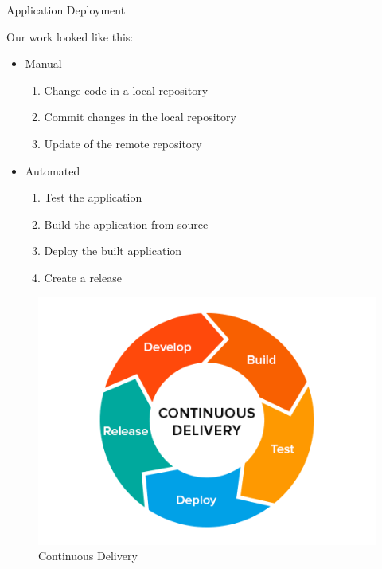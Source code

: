 \documentclass[]{beamer}
\begin{document}
    \begin{frame}{Application Deployment}
      \begin{multicols}{2}
        Our work looked like this:
        \begin{itemize}
          \item Manual
          \begin{enumerate}
            \item[1] Change code in a local repository
            \item[2] Commit changes in the local repository
            \item[3] Update of the remote repository
          \end{enumerate}
          \item Automated
          \begin{enumerate}
            \item[4] Test the application
            \item[5] Build the application from source
            \item[6] Deploy the built application
            \item[7] Create a release
          \end{enumerate}
        \end{itemize}

        \columnbreak

      \begin{figure}[H]
        \includegraphics[width=.5\textwidth,height=.5\textheight,keepaspectratio]{img/continuous_delivery.png}
        \caption{Continuous Delivery}
      \end{figure}
      \end{multicols}
    \end{frame}
\end{document}
